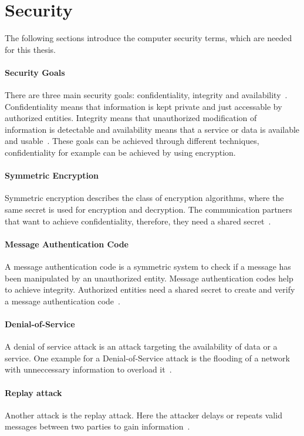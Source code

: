 \pagebreak
\section{Security}
The following sections introduce the computer security terms, which are needed for this thesis.

\paragraph{Security Goals}
There are three main security goals: confidentiality, integrity and availability~\cite{pfleeger2015security}.
Confidentiality means that information is kept private and just accessable by authorized entities.
Integrity means that unauthorized modification of information is detectable and availability means that a service or data is available and usable~\cite{pfitzmann2012security}.
These goals can be achieved through different techniques, confidentiality for example can be achieved by using encryption.

\paragraph{Symmetric Encryption}
Symmetric encryption describes the class of encryption algorithms, where the same secret is used for encryption and decryption.
The communication partners that want to achieve confidentiality, therefore, they need a shared secret~\cite{pfitzmann2012security}.

\paragraph{Message Authentication Code}
A message authentication code is a symmetric system to check if a message has been manipulated by an unauthorized entity.
Message authentication codes help to achieve integrity.
Authorized entities need a shared secret to create and verify a message authentication code~\cite{pfitzmann2012security}.

\paragraph{Denial-of-Service}
A denial of service attack is an attack targeting the availability of data or a service.
One example for a Denial-of-Service attack is the flooding of a network with unneccessary information to overload it~\cite{pfleeger2015security}.

\paragraph{Replay attack}
Another attack is the replay attack.
Here the attacker delays or repeats valid messages between two parties to gain information~\cite{pfleeger2015security}.
